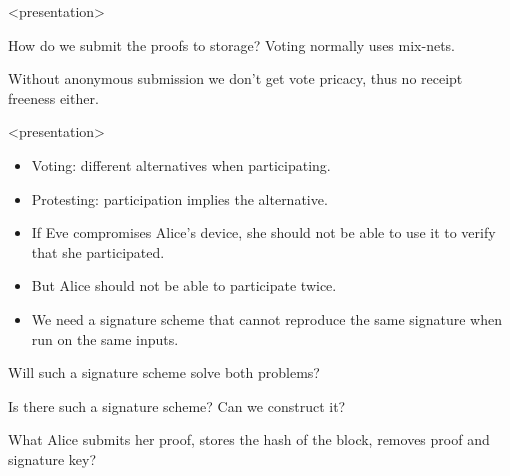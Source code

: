 \begin{frame}<presentation>
  \begin{question}
    How do we submit the proofs to storage?
    Voting normally uses mix-nets.
  \end{question}

  \begin{remark}
    Without anonymous submission we don't get vote pricacy, thus no receipt 
    freeness either.
  \end{remark}
\end{frame}

\begin{frame}<presentation>
  \begin{remark}
    \begin{itemize}
      \item Voting: different alternatives when participating.
      \item Protesting: participation implies the alternative.
    \end{itemize}
  \end{remark}

  \pause

  \begin{idea}
    \begin{itemize}
      \item If Eve compromises Alice's device, she should not be able to use 
        it to verify that she participated.

      \item But Alice should not be able to participate twice.

      \item We need a signature scheme that cannot reproduce the same 
        signature when run on the same inputs.
    \end{itemize}
  \end{idea}
\end{frame}

\begin{frame}
  \begin{question}
    Will such a signature scheme solve both problems?
  \end{question}
  \begin{question}
    Is there such a signature scheme?
    Can we construct it?
  \end{question}
  \begin{question}
    What Alice submits her proof, stores the hash of the block, removes proof 
    and signature key?
  \end{question}
\end{frame}

